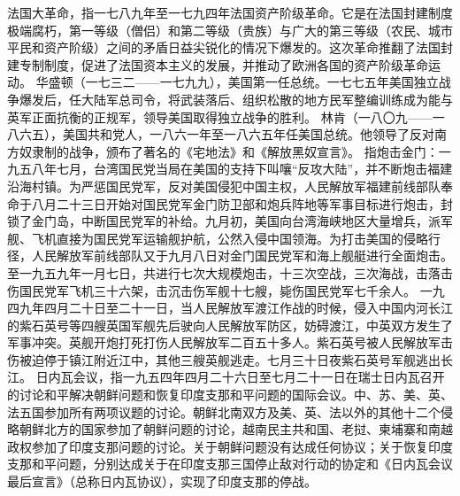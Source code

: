 \begin{maonote}
法国大革命，指一七八九年至一七九四年法国资产阶级革命。它是在法国封建制度极端腐朽，第一等级（僧侣）和第二等级（贵族）与广大的第三等级（农民、城市平民和资产阶级）之间的矛盾日益尖锐化的情况下爆发的。这次革命推翻了法国封建专制制度，促进了法国资本主义的发展，并推动了欧洲各国的资产阶级革命运动。
华盛顿（一七三二——一七九九），美国第一任总统。一七七五年美国独立战争爆发后，任大陆军总司令，将武装落后、组织松散的地方民军整编训练成为能与英军正面抗衡的正规军，领导美国取得独立战争的胜利。
林肯（一八〇九——一八六五），美国共和党人，一八六一年至一八六五年任美国总统。他领导了反对南方奴隶制的战争，颁布了著名的《宅地法》和《解放黑奴宣言》。
指炮击金门：一九五八年七月，台湾国民党当局在美国的支持下叫嚷“反攻大陆”，并不断炮击福建沿海村镇。为严惩国民党军，反对美国侵犯中国主权，人民解放军福建前线部队奉命于八月二十三日开始对国民党军金门防卫部和炮兵阵地等军事目标进行炮击，封锁了金门岛，中断国民党军的补给。九月初，美国向台湾海峡地区大量增兵，派军舰、飞机直接为国民党军运输舰护航，公然入侵中国领海。为打击美国的侵略行径，人民解放军前线部队又于九月八日对金门国民党军和海上舰艇进行全面炮击。至一九五九年一月七日，共进行七次大规模炮击，十三次空战，三次海战，击落击伤国民党军飞机三十六架，击沉击伤军舰十七艘，毙伤国民党军七千余人。
一九四九年四月二十日至二十一日，当人民解放军渡江作战的时候，侵入中国内河长江的紫石英号等四艘英国军舰先后驶向人民解放军防区，妨碍渡江，中英双方发生了军事冲突。英舰开炮打死打伤人民解放军二百五十多人。紫石英号被人民解放军击伤被迫停于镇江附近江中，其他三艘英舰逃走。七月三十日夜紫石英号军舰逃出长江。
日内瓦会议，指一九五四年四月二十六日至七月二十一日在瑞士日内瓦召开的讨论和平解决朝鲜问题和恢复印度支那和平问题的国际会议。中、苏、美、英、法五国参加所有两项议题的讨论。朝鲜北南双方及美、英、法以外的其他十二个侵略朝鲜北方的国家参加了朝鲜问题的讨论，越南民主共和国、老挝、柬埔寨和南越政权参加了印度支那问题的讨论。关于朝鲜问题没有达成任何协议；关于恢复印度支那和平问题，分别达成关于在印度支那三国停止敌对行动的协定和《日内瓦会议最后宣言》（总称日内瓦协议），实现了印度支那的停战。
\end{maonote}
